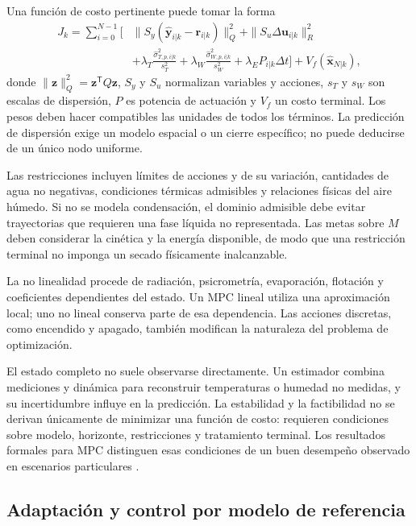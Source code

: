 Una función de costo pertinente puede tomar la forma
\begin{equation}
\begin{aligned}
J_k=\sum_{i=0}^{N-1}\Big[
&\|S_y(\widehat{\mathbf y}_{i|k}-\mathbf r_{i|k})\|_Q^2
+\|S_u\Delta\mathbf u_{i|k}\|_R^2\\
&+\lambda_T\frac{\widehat\sigma_{T,p,i|k}^2}{s_T^2}
+\lambda_W\frac{\widehat\sigma_{W,p,i|k}^2}{s_W^2}
+\lambda_EP_{i|k}\Delta t\Big]
+V_f(\widehat{\mathbf x}_{N|k}),
\end{aligned}
\label{eq:costo_mpc}
\end{equation}
donde $\|\mathbf z\|_Q^2=\mathbf z^{\mathsf T}Q\mathbf z$, $S_y$ y $S_u$ normalizan variables y acciones, $s_T$ y $s_W$ son escalas de dispersión, $P$ es potencia de actuación y $V_f$ un costo terminal. Los pesos deben hacer compatibles las unidades de todos los términos. La predicción de dispersión exige un modelo espacial o un cierre específico; no puede deducirse de un único nodo uniforme.

Las restricciones incluyen límites de acciones y de su variación, cantidades de agua no negativas, condiciones térmicas admisibles y relaciones físicas del aire húmedo. Si no se modela condensación, el dominio admisible debe evitar trayectorias que requieren una fase líquida no representada. Las metas sobre $M$ deben considerar la cinética y la energía disponible, de modo que una restricción terminal no imponga un secado físicamente inalcanzable.

La no linealidad procede de radiación, psicrometría, evaporación, flotación y coeficientes dependientes del estado. Un MPC lineal utiliza una aproximación local; uno no lineal conserva parte de esa dependencia. Las acciones discretas, como encendido y apagado, también modifican la naturaleza del problema de optimización.

El estado completo no suele observarse directamente. Un estimador combina mediciones y dinámica para reconstruir temperaturas o humedad no medidas, y su incertidumbre influye en la predicción. La estabilidad y la factibilidad no se derivan únicamente de minimizar una función de costo: requieren condiciones sobre modelo, horizonte, restricciones y tratamiento terminal. Los resultados formales para MPC distinguen esas condiciones de un buen desempeño observado en escenarios particulares \cite{rawlings2017}.

\subsection{Adaptación y control por modelo de referencia}

